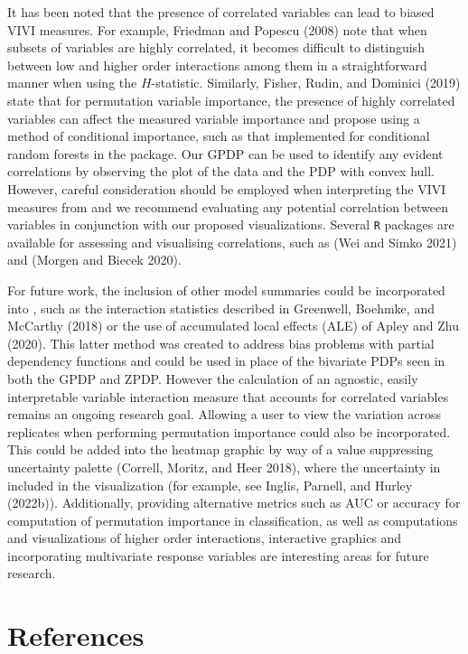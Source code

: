 It has been noted that the presence of correlated variables can lead to biased VIVI measures. For example, Friedman and Popescu (2008) note that when subsets of variables are highly correlated, it becomes difficult to distinguish between low and higher order interactions among them in a straightforward manner when using the \(H\)-statistic. Similarly, Fisher, Rudin, and Dominici (2019) state that for permutation variable importance, the presence of highly correlated variables can affect the measured variable importance and propose using a method of conditional importance, such as that implemented for conditional random forests in the  package. Our GPDP can be used to identify any evident correlations by observing the plot of the data and the PDP with convex hull. However, careful consideration should be employed when interpreting the VIVI measures from  and we recommend evaluating any potential correlation between variables in conjunction with our proposed visualizations. Several \texttt{R} packages are available for assessing and visualising correlations, such as  (Wei and Simko 2021) and  (Morgen and Biecek 2020).

For future work, the inclusion of other model summaries could be incorporated into , such as the interaction statistics described in Greenwell, Boehmke, and McCarthy (2018) or the use of accumulated local effects (ALE) of Apley and Zhu (2020). This latter method was created to address bias problems with partial dependency functions and could be used in place of the bivariate PDPs seen in both the GPDP and ZPDP. However the calculation of an agnostic, easily interpretable variable interaction measure that accounts for correlated variables remains an ongoing research goal. Allowing a user to view the variation across replicates when performing permutation importance could also be incorporated. This could be added into the heatmap graphic by way of a value suppressing uncertainty palette (Correll, Moritz, and Heer 2018), where the uncertainty in included in the visualization (for example, see Inglis, Parnell, and Hurley (2022b)). Additionally, providing alternative metrics such as AUC or accuracy for computation of permutation importance in classification, as well as computations and visualizations of higher order interactions, interactive graphics and incorporating multivariate response variables are interesting areas for future research.

\hypertarget{references}{%
\section*{References}\label{references}}

